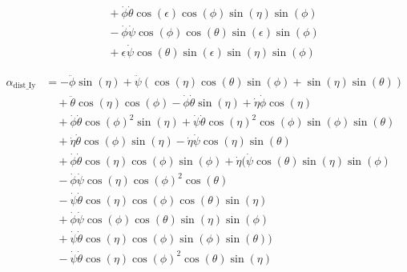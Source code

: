 \documentclass[letterpaper, 10 pt, conference]{ieeeconf}  %
\begin{document}
\begin{equation}
\begin{aligned}
                             & \quad + \dot{\phi}\dot{\theta}\cos(\epsilon)\cos(\phi)\sin(\eta)\sin(\phi)                                                                                     \\
                             & \quad - \dot{\phi}\dot{\psi}\cos(\phi)\cos(\theta)\sin(\epsilon)\sin(\phi)                                                                                     \\
                             & \quad + \epsilon_{\dot{}}\dot{\psi}\cos(\theta)\sin(\epsilon)\sin(\eta)\sin(\phi)
  \end{aligned}
\end{equation}

\begin{equation}
  \begin{aligned}
    \alpha_{\text{dist\_Iy}} & = -\ddot{\phi}\sin(\eta) + \ddot{\psi}(\cos(\eta)\cos(\theta)\sin(\phi) + \sin(\eta)\sin(\theta))                         \\
                             & \quad + \ddot{\theta}\cos(\eta)\cos(\phi) - \dot{\phi}\dot{\theta}\sin(\eta) + \dot{\eta}\dot{\phi}\cos(\eta)             \\
                             & \quad + \dot{\phi}\dot{\theta}\cos(\phi)^2\sin(\eta) + \dot{\psi}\dot{\theta}\cos(\eta)^2\cos(\phi)\sin(\phi)\sin(\theta) \\
                             & \quad + \dot{\eta}\dot{\theta}\cos(\phi)\sin(\eta) - \dot{\eta}\dot{\psi}\cos(\eta)\sin(\theta)                           \\
                             & \quad + \dot{\phi}\dot{\theta}\cos(\eta)\cos(\phi)\sin(\phi) + \dot{\eta}(\dot{\psi}\cos(\theta)\sin(\eta)\sin(\phi)      \\
                             & \quad - \dot{\phi}\dot{\psi}\cos(\eta)\cos(\phi)^2 \cos(\theta)                                                           \\
                             & \quad - \dot{\psi}\dot{\theta}\cos(\eta)\cos(\phi)\cos(\theta)\sin(\eta)                                                  \\
                             & \quad + \dot{\phi}\dot{\psi}\cos(\phi)\cos(\theta)\sin(\eta)\sin(\phi)                                                    \\
                             & \quad + \dot{\psi}\dot{\theta}\cos(\eta)\cos(\phi)\sin(\phi)\sin(\theta))                                                 \\
                             & \quad - \dot{\psi}\dot{\theta}\cos(\eta)\cos(\phi)^2\cos(\theta)\sin(\eta)
  \end{aligned}
\end{equation}
\end{document}
